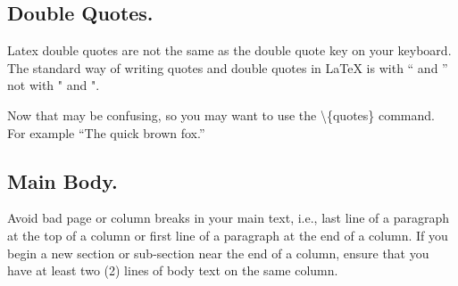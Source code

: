 \documentclass[pageno]{jpaper}
\newcommand{\quotes}[1]{``#1''}
\begin{document}
\subsection{Double Quotes.}

Latex double quotes are not the same as the double quote key on your
keyboard. The standard way of writing quotes and double quotes in
LaTeX is with `` and '' not with " and ".   

Now that may be confusing, so you may want to use the \textbackslash\{quotes\} command.  For
example \quotes{The quick brown fox.}



\subsection{Main Body.}

Avoid bad page or column breaks in
your main text, i.e., last line of a paragraph at the top of a
column or first line of a paragraph at the end of a column. If you
begin a new section or sub-section near the end of a column,
ensure that you have at least two (2)  lines of body text on the same
column. 
\end{document}
